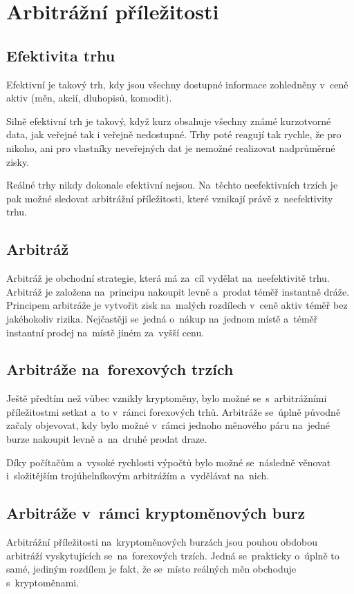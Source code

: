 \documentclass[thesis=B,czech]{FITthesis}[2019/03/21]
\begin{document}
\section{Arbitrážní příležitosti}
\subsection{Efektivita trhu}
Efektivní je takový trh, kdy jsou všechny dostupné informace zohledněny v~ceně aktiv (měn, akcií, dluhopisů, komodit).\cite{efektivita_trhu}

Silně efektivní trh je takový, když kurz obsahuje všechny známé kurzotvorné data, jak veřejné tak i veřejně nedostupné. Trhy poté reagují tak rychle, že pro nikoho, ani pro vlastníky neveřejných dat je nemožné realizovat nadprůměrné zisky. \cite{efektivnost_trhu}

Reálné trhy nikdy dokonale efektivní nejsou. Na~těchto neefektivních trzích je pak možné sledovat arbitrážní příležitosti, které vznikají právě z~neefektivity trhu. \cite{what_is_arbitage}

\subsection{Arbitráž}
Arbitráž je obchodní strategie, která má za~cíl vydělat na~neefektivitě trhu. Arbitráž je založena na~principu nakoupit levně a~prodat téměř instantně dráže. Principem arbitráže je vytvořit zisk na~malých rozdílech v~ceně aktiv téměř bez jakéhokoliv rizika. Nejčastěji se~jedná o~nákup na~jednom místě a~téměř instantní prodej na~místě jiném za~vyšší cenu. \cite{Capital}

\subsection{Arbitráže na~forexových trzích}
Ještě předtím než vůbec vznikly kryptoměny, bylo možné se~s~arbitrážními příležitostmi setkat a~to v~rámci forexových trhů. Arbitráže se~úplně původně začaly objevovat, kdy bylo možné v~rámci jednoho měnového páru na~jedné burze nakoupit levně a~na~druhé prodat draze. 

Díky počítačům a~vysoké rychlosti výpočtů bylo možné se~následně věnovat i~složitějším trojúhelníkovým arbitrážím a~vydělávat na~nich. \cite{investopedia_forex_arbitrage}

\subsection{Arbitráže v~rámci kryptoměnových burz}
Arbitrážní příležitosti na~kryptoměnových burzách jsou pouhou obdobou arbitráží vyskytujících se~na~forexových trzích. Jedná se~prakticky o~úplně to samé, jediným rozdílem je fakt, že se~místo reálných měn obchoduje s~kryptoměnami. 
\end{document}
